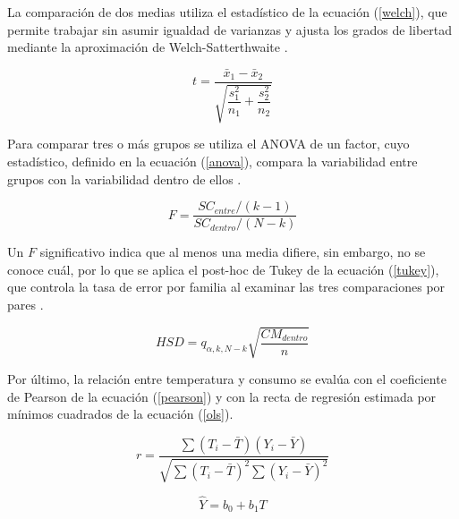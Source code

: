         La comparación de dos medias utiliza el estadístico de la
        ecuación (\ref{welch}), que permite trabajar sin asumir igualdad de
        varianzas y ajusta los grados de libertad mediante la aproximación de
        Welch-Satterthwaite \cite{welch1947generalization}.

        \begin{equation}
            t = \frac{\bar{x}_1 - \bar{x}_2}
                     {\sqrt{\dfrac{s_1^2}{n_1} + \dfrac{s_2^2}{n_2}}}
            \label{welch}
        \end{equation}

        Para comparar tres o más grupos se utiliza el ANOVA de un factor,
        cuyo estadístico, definido en la ecuación (\ref{anova}), compara la
        variabilidad entre grupos con la variabilidad dentro de ellos
        \cite{montgomery2020design}.

        \begin{equation}
            F = \frac{SC_{entre} / (k-1)}{SC_{dentro} / (N-k)}
            \label{anova}
        \end{equation}

        Un $F$ significativo indica que al menos una media difiere, sin embargo, 
        no se conoce cuál, por lo que se aplica el post-hoc de Tukey de la ecuación 
        (\ref{tukey}), que controla la tasa de error por familia al examinar las 
        tres comparaciones por pares \cite{tukey1949comparing}.

        \begin{equation}
            HSD = q_{\alpha,k,N-k} \sqrt{\frac{CM_{dentro}}{n}}
            \label{tukey}
        \end{equation}

        Por último, la relación entre temperatura y consumo se evalúa con el
        coeficiente de Pearson de la ecuación (\ref{pearson})
        \cite{pearson1895regression} y con la recta de regresión estimada por
        mínimos cuadrados de la ecuación (\ref{ols}).

        \begin{equation}
            r = \frac{\sum (T_i - \bar{T})(Y_i - \bar{Y})}
                     {\sqrt{\sum (T_i - \bar{T})^2 \sum (Y_i - \bar{Y})^2}}
            \label{pearson}
        \end{equation}

        \begin{equation}
            \hat{Y} = b_0 + b_1 T
            \label{ols}
        \end{equation}

